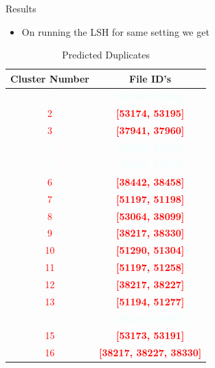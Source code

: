 \documentclass[15pt,t]{beamer}
\begin{document}
\begin{frame}{Results}
\vspace*{-0.3cm}
\begin{itemize}
\item [$\square$] On running the LSH for same setting we get
\end{itemize}
\pause

\begin{table}[H] 
\label{table2}
\begin{center}
\caption{Predicted Duplicates}
\begin{tabular}{|c|c|}
\hline
Cluster Number & File ID's \\
\hline
\textcolor{azure}{1}  & \textcolor{azure}{\textbf{[51150, 51240]}} \\
\textcolor{red}{2}    & \textcolor{red}{\textbf{[53174, 53195]}}   \\
\textcolor{red}{3}    & \textcolor{red}{\textbf{[37941, 37960]}}    \\
\textcolor{azure}{4}  & \textcolor{azure}{\textbf{[38320, 38432]}}   \\
\textcolor{azure}{5}  & \textcolor{azure}{\textbf{[53072, 53178]}}  \\
\textcolor{red}{6}    & \textcolor{red}{\textbf{[38442, 38458]}}     \\
\textcolor{red}{7}    & \textcolor{red}{\textbf{[51197, 51198]}}   \\
\textcolor{red}{8 }   & \textcolor{red}{\textbf{[53064, 38099]}}    \\
\textcolor{red}{9 }   & \textcolor{red}{\textbf{[38217, 38330]}}    \\
\textcolor{red}{10}   & \textcolor{red}{\textbf{[51290, 51304]}}     \\
\textcolor{red}{11}   & \textcolor{red}{\textbf{[51197, 51258]}}     \\
\textcolor{red}{12}   & \textcolor{red}{\textbf{[38217, 38227]}}     \\
\textcolor{red}{13}   & \textcolor{red}{\textbf{[51194, 51277]}}      \\
\textcolor{azure}{14} & \textcolor{azure}{\textbf{[38216, 38255]}}     \\
\textcolor{red}{15}   & \textcolor{red}{\textbf{[53173, 53191]}}        \\
\textcolor{red}{16}   & \textcolor{red}{\textbf{[38217, 38227, 38330]}} \\
\hline
\end{tabular}
\end{center}
\end{table}
\end{frame}
\end{document}
